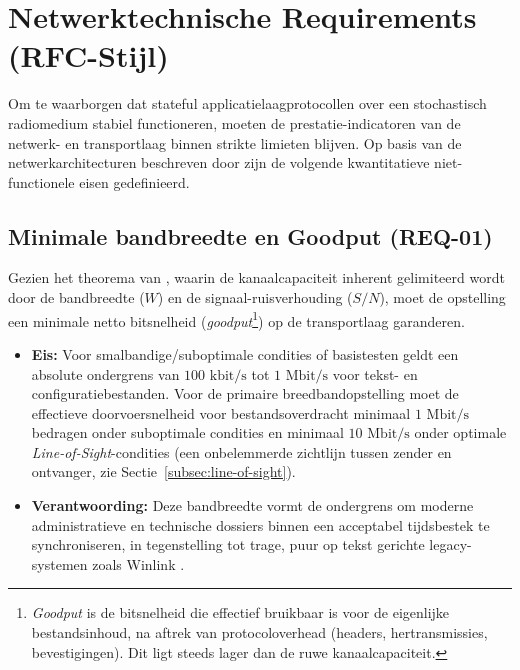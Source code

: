 \section{Netwerktechnische Requirements (RFC-Stijl)}
\label{sec:req-netwerk}

Om te waarborgen dat stateful applicatielaagprotocollen over een stochastisch radiomedium stabiel functioneren, moeten de prestatie-indicatoren van de netwerk- en transportlaag binnen strikte limieten blijven. Op basis van de netwerkarchitecturen beschreven door \textcite{Tanenbaum2021} zijn de volgende kwantitatieve niet-functionele eisen gedefinieerd.

\subsection{Minimale bandbreedte en Goodput (REQ-01)}
Gezien het theorema van \textcite{Shannon1948}, waarin de kanaalcapaciteit inherent gelimiteerd wordt door de bandbreedte ($W$) en de signaal-ruisverhouding ($S/N$), moet de opstelling een minimale netto bitsnelheid (\textit{goodput}\footnote{\textit{Goodput} is de bitsnelheid die effectief bruikbaar is voor de eigenlijke bestandsinhoud, na aftrek van protocoloverhead (headers, hertransmissies, bevestigingen). Dit ligt steeds lager dan de ruwe kanaalcapaciteit.}) op de transportlaag garanderen.
\begin{itemize}
    \item \textbf{Eis:} Voor smalbandige/suboptimale condities of basistesten geldt een absolute ondergrens van $100\text{ kbit/s}$ tot $1\text{ Mbit/s}$ voor tekst- en configuratiebestanden. Voor de primaire breedbandopstelling moet de effectieve doorvoersnelheid voor bestandsoverdracht minimaal $1\text{ Mbit/s}$ bedragen onder suboptimale condities en minimaal $10\text{ Mbit/s}$ onder optimale \textit{Line-of-Sight}-condities (een onbelemmerde zichtlijn tussen zender en ontvanger, zie Sectie~\ref{subsec:line-of-sight}).
    \item \textbf{Verantwoording:} Deze bandbreedte vormt de ondergrens om moderne administratieve en technische dossiers binnen een acceptabel tijdsbestek te synchroniseren, in tegenstelling tot trage, puur op tekst gerichte legacy-systemen zoals Winlink \autocite{WinlinkOverview}.
\end{itemize}

